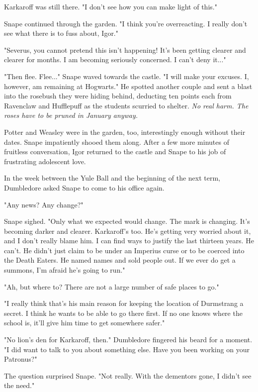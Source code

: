 Karkaroff was still there. "I don't see how you can make light of this."

Snape continued through the garden. "I think you're overreacting. I really don't see what there is to fuss about, Igor."

"Severus, you cannot pretend this isn't happening! It's been getting clearer and clearer for months. I am becoming seriously concerned. I can't deny it..."

"Then flee. Flee..." Snape waved towards the castle. "I will make your excuses. I, however, am remaining at Hogwarts." He spotted another couple and sent a blast into the rosebush they were hiding behind, deducting ten points each from Ravenclaw and Hufflepuff as the students scurried to shelter. \emph{No real harm. The roses have to be pruned in January anyway.}

Potter and Weasley were in the garden, too, interestingly enough without their dates. Snape impatiently shooed them along. After a few more minutes of fruitless conversation, Igor returned to the castle and Snape to his job of frustrating adolescent love.

In the week between the Yule Ball and the beginning of the next term, Dumbledore asked Snape to come to his office again.

"Any news? Any change?"

Snape sighed. "Only what we expected would change. The mark is changing. It's becoming darker and clearer. Karkaroff's too. He's getting very worried about it, and I don't really blame him. I can find ways to justify the last thirteen years. He can't. He didn't just claim to be under an Imperius curse or to be coerced into the Death Eaters. He named names and sold people out. If we ever do get a summons, I'm afraid he's going to run."

"Ah, but where to? There are not a large number of safe places to go."

"I really think that's his main reason for keeping the location of Durmstrang a secret. I think he wants to be able to go there first. If no one knows where the school is, it'll give him time to get somewhere safer."

"No lion's den for Karkaroff, then." Dumbledore fingered his beard for a moment. "I did want to talk to you about something else. Have you been working on your Patronus?"

The question surprised Snape. "Not really. With the dementors gone, I didn't see the need."

